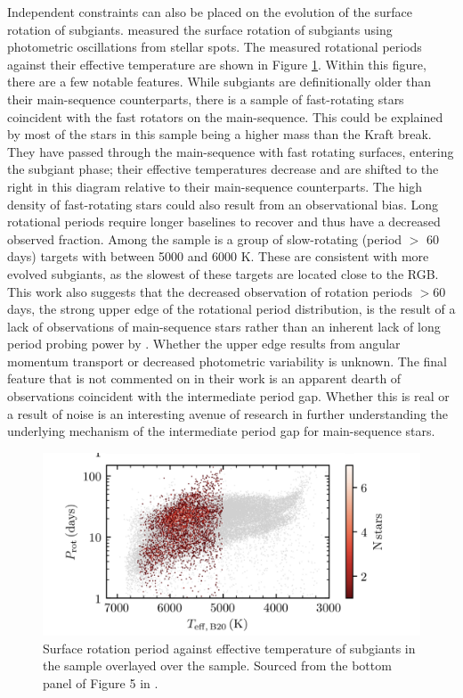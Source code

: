 Independent constraints can also be placed on the evolution of the surface rotation of subgiants.
\citet{santos_surface_2021} measured the surface rotation of  subgiants using photometric oscillations from stellar spots.
The measured rotational periods against their effective temperature are shown in Figure \ref{fig:subgiant_surface}.
Within this figure, there are a few notable features.
While subgiants are definitionally older than their main-sequence counterparts, there is a sample of fast-rotating stars coincident with the fast rotators on the main-sequence.
This could be explained by most of the stars in this sample being a higher mass than the Kraft break.
They have passed through the main-sequence with fast rotating surfaces, entering the subgiant phase; their effective temperatures decrease and are shifted to the right in this diagram relative to their main-sequence counterparts.
The high density of fast-rotating stars could also result from an observational bias.
Long rotational periods require longer baselines to recover and thus have a decreased observed fraction.
Among the sample is a group of slow-rotating (period $>$ 60 days) targets with \teff{} between 5000 and 6000 K.
These are consistent with more evolved subgiants, as the slowest of these targets are located close to the RGB.
This work also suggests that the decreased observation of rotation periods $>$60 days, the strong upper edge of the \citet{mcquillan_rotation_2014} rotational period distribution, is the result of a lack of observations of main-sequence stars rather than an inherent lack of long period probing power by \kepler. 
Whether the upper edge results from angular momentum transport or decreased photometric variability is unknown.
The final feature that is not commented on in their work is an apparent dearth of observations coincident with the intermediate period gap.
Whether this is real or a result of noise is an interesting avenue of research in further understanding the underlying mechanism of the intermediate period gap for main-sequence stars.

\begin{figure}[h]
    \includegraphics[width=\textwidth]{Figures/intro_figures/subgiant_surface.png}
    \caption[Surface rotation period distribution of subgiant stars]{Surface rotation period against effective temperature of subgiants in the \citet{santos_surface_2021} sample overlayed over the \kepler{} \citet{mcquillan_rotation_2014} sample. 
    Sourced from the bottom panel of Figure 5 in \citet{santos_surface_2021}.}
    \label{fig:subgiant_surface}
\end{figure}

